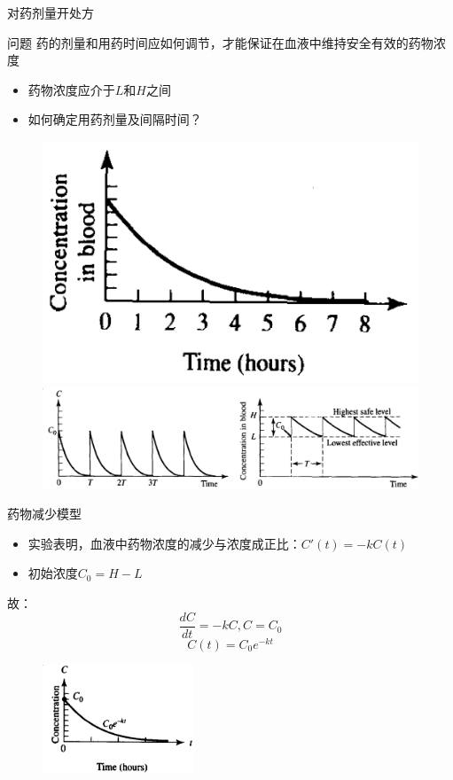 \documentclass[mathserif, table]{beamer}
\begin{document}
\begin{frame}{对药剂量开处方}
  \begin{block}{问题}
    药的剂量和用药时间应如何调节，才能保证在血液中维持安全有效的药物浓度
  \end{block}
  
  \begin{itemize}
  \item 药物浓度应介于$L$和$H$之间
  \item 如何确定用药剂量及间隔时间？
  \end{itemize}
  
  \begin{figure}
    \centering
    \includegraphics[height=0.25\textheight]{dd.png}
    \includegraphics[height=0.25\textheight]{dr.png}
  \end{figure}
  
\end{frame}

\begin{frame}{药物减少模型}
  \begin{itemize}
  \item 实验表明，血液中药物浓度的减少与浓度成正比：$C'(t) = -kC(t)$
  \item 初始浓度$C_0 = H-L$
  \end{itemize}
  故：
  \[
  \frac{dC}{dt} = -kC, C=C_0
  \]
  \[
  C(t) = C_0e^{-kt}
  \]

  \begin{figure}
    \centering
    \includegraphics[width=0.4\textwidth]{dc.png}
  \end{figure}

\end{frame}
\end{document}
